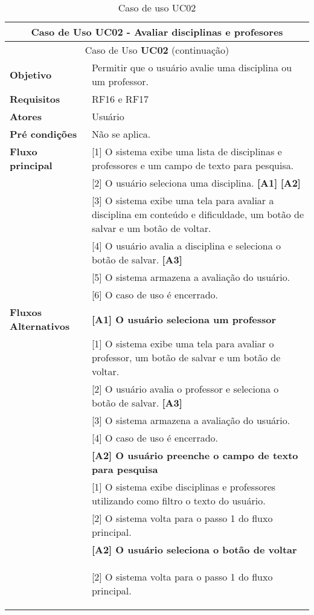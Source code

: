 \begin{longtable}{ | m{} | m{} | }
    
    \hline\hline
    
    \multicolumn{2}{|c|}{Caso de Uso \textbf{UC02} - Avaliar disciplinas e profesores}\tabularnewline\hline\hline
    \endfirsthead

    \hline\hline
    \multicolumn{2}{|c|}{Caso de Uso \textbf{UC02} (continuação)}\tabularnewline\hline\hline
    \endhead

    \hline
    \endfoot

    \hline
    \caption{Caso de uso UC02}
    \endlastfoot

    \textbf{Objetivo} & Permitir que o usuário avalie uma disciplina ou um professor.\tabularnewline\hline
    
    \textbf{Requisitos} & RF16 e RF17\tabularnewline\hline

    \textbf{Atores} & Usuário\tabularnewline\hline

    \textbf{Pré condições} & Não se aplica.\tabularnewline\hline

    \multirow{1}{*}{\textbf{Fluxo principal}} & [1] O sistema exibe uma lista de disciplinas e professores e um campo de texto para pesquisa.\tabularnewline\cline{2-2}
    & [2] O usuário seleciona uma disciplina. \textbf{[A1]} \textbf{[A2]}\tabularnewline\cline{2-2}
    & [3] O sistema exibe uma tela para avaliar a disciplina em conteúdo e dificuldade, um botão de salvar e um botão de voltar.\tabularnewline\cline{2-2}
    & [4] O usuário avalia a disciplina e seleciona o botão de salvar. \textbf{[A3]}\tabularnewline\cline{2-2}
    & [5] O sistema armazena a avaliação do usuário.\tabularnewline\cline{2-2}
    & [6] O caso de uso é encerrado.\tabularnewline\hline

    \multirow{1}{*}{\textbf{Fluxos Alternativos}} & \textbf{[A1] O usuário seleciona um professor}\tabularnewline\cline{2-2}
    & [1] O sistema exibe uma tela para avaliar o professor, um botão de salvar e um botão de voltar.\tabularnewline\cline{2-2}
    & [2] O usuário avalia o professor e seleciona o botão de salvar. \textbf{[A3]}\tabularnewline\cline{2-2} 
    & [3] O sistema armazena a avaliação do usuário.\tabularnewline\cline{2-2}
    & [4] O caso de uso é encerrado.\tabularnewline\cline{2-2}

    & \textbf{[A2] O usuário preenche o campo de texto para pesquisa}\tabularnewline\cline{2-2}
    & [1] O sistema exibe disciplinas e professores utilizando como filtro o texto do usuário.\tabularnewline\cline{2-2}
    & [2] O sistema volta para o passo 1 do fluxo principal.\tabularnewline\cline{2-2}

    & \textbf{[A2] O usuário seleciona o botão de voltar}\tabularnewline\cline{2-2}
    & [2] O sistema volta para o passo 1 do fluxo principal. %

    \label{tab:uc02}
\end{longtable}


